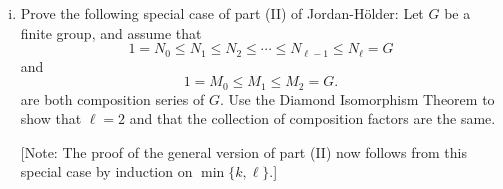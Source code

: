 \documentclass[11pt, reqno]{amsart}
\theoremstyle{plain}
\theoremstyle{definition}
\theoremstyle{example}
\begin{document}
\begin{enumerate}[1.]
\begin{enumerate}
\begin{enumerate}[(i)]
both define composition series of $D_8$. Then show that, as (multi)sets, 
$$\{N_3/N_2, N_2/N_1, N_1/N_0\} = \{M_3/M_2, M_2/M_1, M_1/M_0\}$$ 
(up to isomorphism). 
\item Prove the following special case of part (II) of Jordan-H\"{o}lder: Let $G$ be a finite group, and assume that 
\begin{equation}\tag{$*$}\label{comp-series-1}
1 = N_0 \leq N_1 \leq N_2 \leq \cdots \leq N_{\ell-1} \leq N_\ell = G
\end{equation}
and 
\begin{equation}\tag{$**$}\label{comp-series-2}
1 = M_0 \leq M_1 \leq M_2 = G.
\end{equation}
are both composition series of $G$. Use the Diamond Isomorphism Theorem to show that $\ell = 2$ and that the collection of composition factors are the same.

{\footnotesize[Note: The proof of the general version of part (II) now follows from this special case by induction on $\min\{k, \ell\}$.]}
\end{enumerate}
\end{enumerate}



\end{enumerate}
\end{document}
